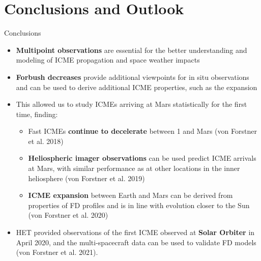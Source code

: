\documentclass[10pt,aspectratio=169,usenames,dvipsnames]{beamer}
\begin{document}
\section{Conclusions and Outlook}

\begin{frame}{Conclusions}
    \begin{itemize}
    	\item \textbf{Multipoint observations} are essential for the better understanding and modeling of ICME propagation and space weather impacts
    	\item \textbf{Forbush decreases} provide additional viewpoints for in situ observations and can be used to derive additional ICME properties, such as the expansion
    	\item This allowed us to study ICMEs arriving at Mars statistically for the first time, finding:
    	\begin{itemize}
    		\item Fast ICMEs \textbf{continue to decelerate} between \SI{1}{\AU} and Mars (von Forstner et al. 2018)
    		\item \textbf{Heliospheric imager observations} can be used predict ICME arrivals at Mars, with similar performance as at other locations in the inner heliosphere (von Forstner et al. 2019)
    		\item \textbf{ICME expansion} between Earth and Mars can be derived from properties of FD profiles and is in line with evolution closer to the Sun (von Forstner et al. 2020)
    	\end{itemize}
    	\item HET provided observations of the first ICME observed at \textbf{Solar Orbiter} in April 2020, and the multi-spacecraft data can be used to validate FD models (von Forstner et al. 2021).
    \end{itemize}
\end{frame}
\end{document}
